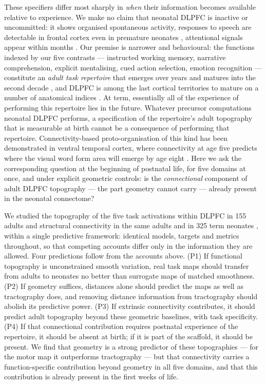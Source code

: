 \documentclass[11pt]{article}
\begin{document}
These specifiers differ most sharply in \emph{when} their information becomes
available relative to experience. We make no claim that neonatal DLPFC is
inactive or uncommitted: it shows organised spontaneous activity, responses
to speech are detectable in frontal cortex even in premature neonates
\citep{mahmoudzadeh2013,dehaenelambertz2002}, attentional signals appear
within months \citep{ellis2021}. Our premise is narrower
and behavioural: the functions indexed by our five contrasts --- instructed
working memory, narrative comprehension, explicit mentalising, cued action
selection, emotion recognition --- constitute an \emph{adult task repertoire}
that emerges over years and matures into the second decade
\citep{wellman2001,luna2004}, and DLPFC is among the last cortical
territories to mature on a number of anatomical indices
\citep{chugani1986,huttenlocher1997,gogtay2004}. At term, essentially all of
the experience of performing this repertoire lies in the future. Whatever
precursor computations neonatal DLPFC performs, a specification of the
repertoire's adult topography that is measurable at birth cannot be a
consequence of performing that repertoire. Connectivity-based
proto-organisation of this kind has been demonstrated in ventral temporal
cortex, where connectivity at age five predicts where the visual word form
area will emerge by age eight \citep{saygin2016}. Here we ask the
corresponding question at the beginning of postnatal life, for five domains
at once, and under explicit geometric controls: is the \emph{connectional}
component of adult DLPFC topography --- the part geometry cannot carry ---
already present in the neonatal connectome?

We studied the topography of the five task activations within DLPFC in 155 adults
\citep{vanessen2013,barch2013} and structural connectivity in the same adults
and in 325 term neonates \citep{edwards2022}, within a single predictive
framework: identical models, targets and metrics throughout, so that
competing accounts differ only in the information they are allowed. Four
predictions follow from the accounts above. (P1) If functional topography is
unconstrained smooth variation, real task maps should transfer from adults to
neonates no better than surrogate maps of matched smoothness. (P2) If
geometry suffices, distances alone should predict the maps as well as
tractography does, and removing distance information from tractography should
abolish its predictive power. (P3) If extrinsic connectivity contributes, it
should predict adult topography beyond these geometric baselines, with task
specificity. (P4) If that connectional contribution requires postnatal
experience of the repertoire, it should be absent at birth; if it is part of
the scaffold, it should be present. We find that geometry is a strong predictor
of these topographies --- for the motor map it outperforms tractography ---
but that connectivity carries a function-specific contribution beyond
geometry in all five domains, and that this contribution is already present
in the first weeks of life.
\end{document}
